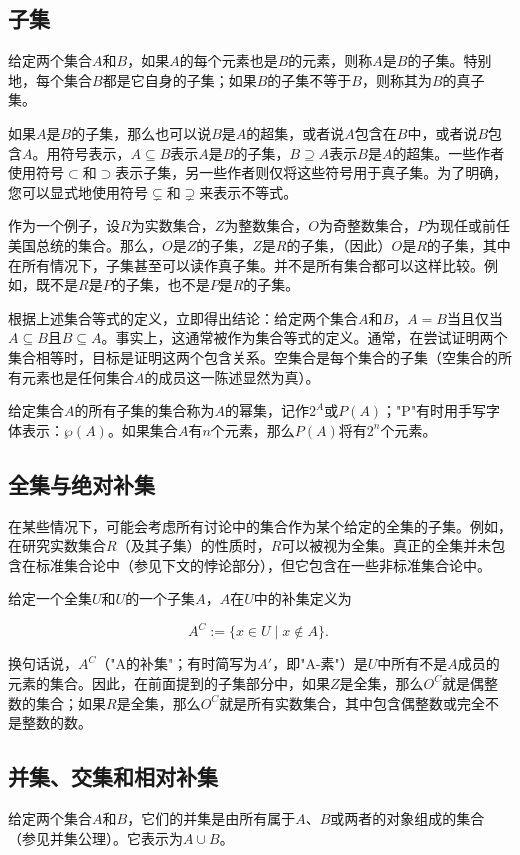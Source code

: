 \subsection{子集}  
给定两个集合$A$和$B$，如果$A$的每个元素也是$B$的元素，则称$A$是$B$的子集。特别地，每个集合$B$都是它自身的子集；如果$B$的子集不等于$B$，则称其为$B$的真子集。

如果$A$是$B$的子集，那么也可以说$B$是$A$的超集，或者说$A$包含在$B$中，或者说$B$包含$A$。用符号表示，$A \subseteq B$表示$A$是$B$的子集，$B \supseteq A$表示$B$是$A$的超集。一些作者使用符号$\subset$和$\supset$表示子集，另一些作者则仅将这些符号用于真子集。为了明确，您可以显式地使用符号$\subsetneq$和$\supsetneq$来表示不等式。

作为一个例子，设$R$为实数集合，$Z$为整数集合，$O$为奇整数集合，$P$为现任或前任美国总统的集合。那么，$O$是$Z$的子集，$Z$是$R$的子集，（因此）$O$是$R$的子集，其中在所有情况下，子集甚至可以读作真子集。并不是所有集合都可以这样比较。例如，既不是$R$是$P$的子集，也不是$P$是$R$的子集。

根据上述集合等式的定义，立即得出结论：给定两个集合$A$和$B$，$A = B$当且仅当$A \subseteq B$且$B \subseteq A$。事实上，这通常被作为集合等式的定义。通常，在尝试证明两个集合相等时，目标是证明这两个包含关系。空集合是每个集合的子集（空集合的所有元素也是任何集合$A$的成员这一陈述显然为真）。

给定集合$A$的所有子集的集合称为$A$的幂集，记作$2^A$或$P(A)$；"P"有时用手写字体表示：$\wp(A)$。如果集合$A$有$n$个元素，那么$P(A)$将有$2^n$个元素。
\subsection{全集与绝对补集}  
在某些情况下，可能会考虑所有讨论中的集合作为某个给定的全集的子集。例如，在研究实数集合$R$（及其子集）的性质时，$R$可以被视为全集。真正的全集并未包含在标准集合论中（参见下文的悖论部分），但它包含在一些非标准集合论中。

给定一个全集$U$和$U$的一个子集$A$，$A$在$U$中的补集定义为

$$A^C := \{x \in U \mid x \notin A\}.~$$

换句话说，$A^C$（"A的补集"；有时简写为$A'$，即"A-素"）是$U$中所有不是$A$成员的元素的集合。因此，在前面提到的子集部分中，如果$Z$是全集，那么$O^C$就是偶整数的集合；如果$R$是全集，那么$O^C$就是所有实数集合，其中包含偶整数或完全不是整数的数。
\subsection{并集、交集和相对补集}  
给定两个集合$A$和$B$，它们的并集是由所有属于$A$、$B$或两者的对象组成的集合（参见并集公理）。它表示为$A \cup B$。

